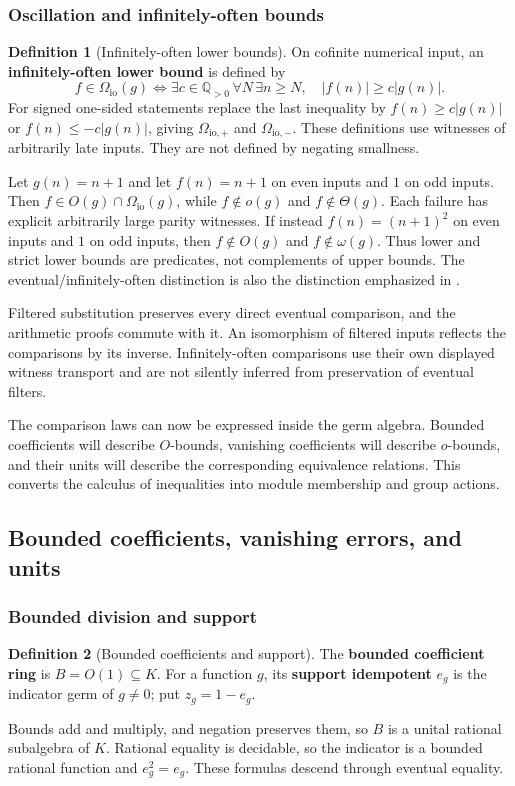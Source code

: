 \documentclass[11pt,a4paper]{article}
\numberwithin{algorithm}{section}
\numberwithin{equation}{section}
\theoremstyle{definition}
\newtheorem{definition}[definition]{Definition}
\theoremstyle{remark}
\theoremstyle{plain}
\newcommand{\QQ}{\mathbb Q}
\newcommand{\abs}[1]{\lvert #1\rvert}
\theoremstyle{definition}
\theoremstyle{plain}
\begin{document}
\subsubsection{Oscillation and infinitely-often bounds}


\begin{definition}[Infinitely-often lower bounds]\label{def:infinitely-often-bounds}
On cofinite numerical input, an \textbf{infinitely-often lower bound} is defined by
\[
 f\in\Omega_{\mathrm{io}}(g)\iff
 \exists c\in\QQ_{>0}\,\forall N\,\exists n\ge N,\quad
 \abs{f(n)}\ge c\abs{g(n)}.
\]
For signed one-sided statements replace the last inequality
by $f(n)\ge c\abs{g(n)}$ or $f(n)\le-c\abs{g(n)}$,
giving $\Omega_{\mathrm{io},+}$ and $\Omega_{\mathrm{io},-}$.
These definitions use witnesses of arbitrarily late
inputs. They are not defined by negating smallness.
\end{definition}


Let $g(n)=n+1$ and let $f(n)=n+1$ on even inputs and $1$ on odd
inputs. Then $f\in O(g)\cap\Omega_{\mathrm{io}}(g)$, while
$f\notin o(g)$ and $f\notin\Theta(g)$. Each failure has explicit
arbitrarily large parity witnesses. If instead $f(n)=(n+1)^2$
on even inputs and $1$ on odd inputs, then
$f\notin O(g)$ and $f\notin\omega(g)$.
Thus lower and strict lower bounds are predicates,
not complements of upper bounds. The eventual/infinitely-often
distinction is also the distinction emphasized in \citep{Knuth}.

Filtered substitution preserves every direct eventual comparison,
and the arithmetic proofs commute with it. An isomorphism of
filtered inputs reflects the comparisons by its inverse.
Infinitely-often comparisons use their own displayed witness
transport and are not silently inferred from preservation of
eventual filters.

The comparison laws can now be expressed inside the germ algebra.
Bounded coefficients will describe $O$-bounds, vanishing coefficients
will describe $o$-bounds, and their units will describe the corresponding
equivalence relations. This converts the calculus of inequalities into
module membership and group actions.

\subsection{Bounded coefficients, vanishing errors, and units}
\label{sec:coefficients}
\subsubsection{Bounded division and support}
\begin{definition}[Bounded coefficients and support]\label{def:bounded-coefficients}
The \textbf{bounded coefficient ring} is $B=O(1)\subseteq K$.
For a function $g$, its \textbf{support idempotent} $e_g$ is the
indicator germ of $g\ne0$; put $z_g=1-e_g$.
\end{definition}
Bounds add and multiply, and negation preserves them, so $B$ is a
unital rational subalgebra of $K$. Rational equality is decidable,
so the indicator is a bounded rational function and $e_g^2=e_g$.
These formulas descend through eventual equality.
\end{document}
